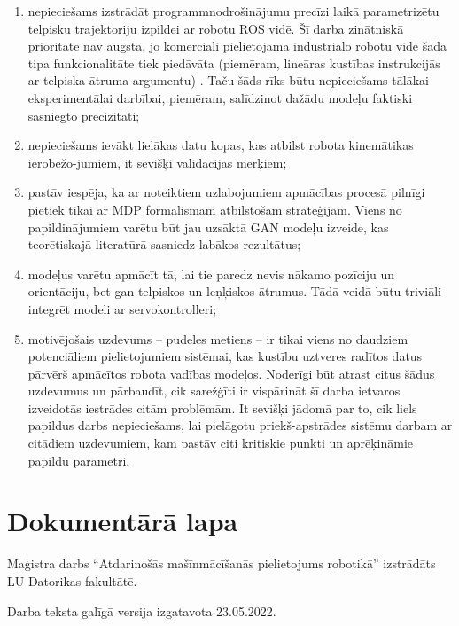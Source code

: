 \documentclass[12pt, a4paper]{article}
\numberwithin{equation}{section} %
\begin{document}
\begin{enumerate}
    \item nepieciešams izstrādāt programmnodrošinājumu precīzi laikā parametrizētu telpisku trajektoriju izpildei ar robotu ROS vidē. Šī darba zinātniskā prioritāte nav augsta, jo komerciāli pielietojamā industriālo robotu vidē šāda tipa funkcionalitāte tiek piedāvāta (piemēram, lineāras kustības instrukcijās ar telpiska ātruma argumentu) \cite{abb_rapid}. Taču šāds rīks būtu nepieciešams tālākai eksperimentālai darbībai, piemēram, salīdzinot dažādu modeļu faktiski sasniegto precizitāti;
    \item nepieciešams ievākt lielākas datu kopas, kas atbilst robota kinemātikas ierobežo-jumiem, it sevišķi validācijas mērķiem;
    \item pastāv iespēja, ka ar noteiktiem uzlabojumiem apmācības procesā pilnīgi pietiek tikai ar MDP formālismam atbilstošām stratēģijām. Viens no papildinājumiem varētu būt jau uzsāktā GAN modeļu izveide, kas teorētiskajā literatūrā sasniedz labākos rezultātus;
    \item modeļus varētu apmācīt tā, lai tie paredz nevis nākamo pozīciju un orientāciju, bet gan telpiskos un leņķiskos ātrumus. Tādā veidā būtu triviāli integrēt modeli ar servokontrolleri;
    \item motivējošais uzdevums -- pudeles metiens -- ir tikai viens no daudziem potenciāliem pielietojumiem sistēmai, kas kustību uztveres radītos datus pārvērš apmācītos robota vadības modeļos. Noderīgi būt atrast citus šādus uzdevumus un pārbaudīt, cik sarežģīti ir vispārināt šī darba ietvaros izveidotās iestrādes citām problēmām. It sevišķi jādomā par to, cik liels papildus darbs nepieciešams, lai pielāgotu priekš-apstrādes sistēmu darbam ar citādiem uzdevumiem, kam pastāv citi kritiskie punkti un aprēķināmie papildu parametri.
\end{enumerate}

\newpage
{}
{}
\printbibliography[title=Atsauces]


\newpage
{}
\section*{Dokumentārā lapa}
\thispagestyle{empty}

Maģistra darbs ``Atdarinošās mašīnmācīšanās pielietojums robotikā'' izstrādāts LU Datorikas fakultātē. \bigbreak

Darba teksta galīgā versija izgatavota 23.05.2022. \bigbreak
\end{document}
